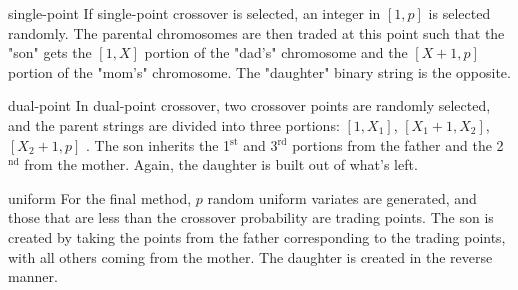 \documentclass{book}
\begin{document}
\begin{compactitem}
\item[single-point] If single-point crossover is selected, an integer in $%
\left[ 1,p\right] $ is selected randomly. The parental chromosomes are then
traded at this point such that the "son" gets the $\left[ 1,X\right]$ portion of the "dad's" chromosome and the $\left[ X+1,p\right] $ portion of
the "mom's" chromosome. The "daughter" binary string is the opposite.

\item[dual-point] In dual-point crossover, two crossover points are randomly
selected, and the parent strings are divided into three portions: $\left[
1,X_{1}\right] $, $\left[ X_{1}+1,X_{2}\right] $, $\left[ X_{2}+1,p\right] $%
. The son inherits the 1$^{\text{st}}$ and 3$^{\text{rd}}$ portions from the
father and the 2$^{\text{nd}}$ from the mother. Again, the daughter is built
out of what's left.

\item[uniform] For the final method, $p$ random uniform variates are
generated, and those that are less than the crossover
probability are trading points. The son is created by taking
the points from the father corresponding to the trading points,
with all others coming from the mother. The daughter is created
in the reverse manner.
\end{compactitem}
\end{document}
